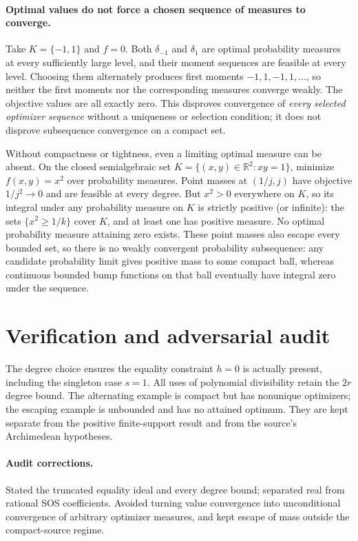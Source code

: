 \documentclass[11pt]{article}
\begin{document}
\paragraph{Optimal values do not force a chosen sequence of measures to converge.}
Take $K=\{-1,1\}$ and $f=0$. Both $\delta_{-1}$ and $\delta_1$ are
optimal probability measures at every sufficiently large level, and their
moment sequences are feasible at every level. Choosing them alternately
produces first moments $-1,1,-1,1,\ldots$, so neither the first moments nor
the corresponding measures converge weakly. The objective values are all
exactly zero. This disproves convergence of \emph{every selected optimizer
sequence} without a uniqueness or selection condition; it does not disprove
subsequence convergence on a compact set.

Without compactness or tightness, even a limiting optimal measure can be absent.
On the closed semialgebraic set
$K=\{(x,y)\in\mathbb R^2:xy=1\}$, minimize $f(x,y)=x^2$ over probability
measures. Point masses at $(1/j,j)$ have objective $1/j^2\to0$ and are
feasible at every degree. But $x^2>0$ everywhere on $K$, so its integral under
any probability measure on $K$ is strictly positive (or infinite): the sets
$\{x^2\geq1/k\}$ cover $K$, and at least one has positive measure.
No optimal probability measure attaining zero exists. These point masses also
escape every bounded set, so there is no weakly convergent probability
subsequence: any candidate probability limit gives positive mass to some compact
ball, whereas continuous bounded bump functions on that ball eventually have
integral zero under the sequence.

\section{Verification and adversarial audit}

The degree choice ensures the equality constraint $h=0$ is actually present,
including the singleton case $s=1$. All uses of polynomial divisibility retain
the $2r$ degree bound. The alternating example is compact but has nonunique
optimizers; the escaping example is unbounded and has no attained optimum.
They are kept separate from the positive finite-support result and from the
source's Archimedean hypotheses.

\paragraph{Audit corrections.} Stated the truncated equality ideal and every degree bound; separated
real from rational SOS coefficients. Avoided turning value convergence into
unconditional convergence of arbitrary optimizer measures, and kept escape of
mass outside the compact-source regime.
\end{document}
